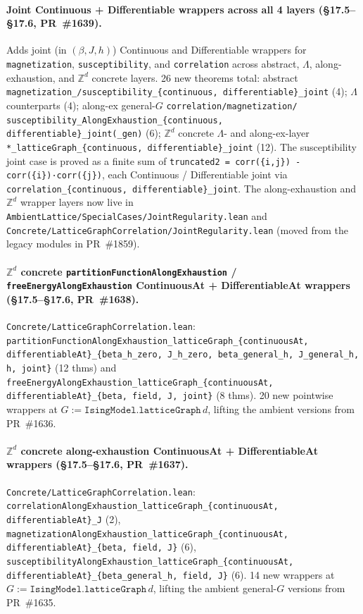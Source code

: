 \documentclass[a4paper,11pt]{article}
\begin{document}
\paragraph{Joint Continuous + Differentiable wrappers across
all 4 layers
(\S17.5--\S17.6, PR~\#1639).} Adds joint (in $(\beta, J, h)$)
Continuous and Differentiable wrappers for
\texttt{magnetization}, \texttt{susceptibility}, and
\texttt{correlation} across abstract, $\Lambda$, along-exhaustion,
and $\mathbb{Z}^d$ concrete layers. 26 new theorems total:
abstract \texttt{magnetization\_/susceptibility\_\{continuous,
differentiable\}\_joint} (4); $\Lambda$ counterparts (4); along-ex
general-$G$ \texttt{correlation/magnetization/
susceptibility\_AlongExhaustion\_\{continuous,
differentiable\}\_joint(\_gen)} (6); $\mathbb{Z}^d$ concrete
$\Lambda$- and along-ex-layer
\texttt{*\_latticeGraph\_\{continuous, differentiable\}\_joint}
(12). The susceptibility joint case is proved as a finite sum of
\texttt{truncated2 = corr(\{i,j\}) - corr(\{i\})·corr(\{j\})},
each Continuous / Differentiable joint via
\texttt{correlation\_\{continuous, differentiable\}\_joint}. The
along-exhaustion and $\mathbb{Z}^d$ wrapper layers now live in
\texttt{AmbientLattice/SpecialCases/JointRegularity.lean} and
\texttt{Concrete/LatticeGraphCorrelation/JointRegularity.lean}
(moved from the legacy modules in PR~\#1859).

\paragraph{$\mathbb{Z}^d$ concrete
\texttt{partitionFunctionAlongExhaustion} /
\texttt{freeEnergyAlongExhaustion} ContinuousAt +
DifferentiableAt wrappers
(\S17.5--\S17.6, PR~\#1638).}
\texttt{Concrete/LatticeGraphCorrelation.lean}:
\texttt{partitionFunctionAlongExhaustion\_latticeGraph\_\{continuousAt,
differentiableAt\}\_\{beta\_h\_zero, J\_h\_zero,
beta\_general\_h, J\_general\_h, h, joint\}} (12 thms) and
\texttt{freeEnergyAlongExhaustion\_latticeGraph\_\{continuousAt,
differentiableAt\}\_\{beta, field, J, joint\}} (8 thms). 20 new
pointwise wrappers at $G := \texttt{IsingModel.latticeGraph}\,d$,
lifting the ambient versions from PR~\#1636.

\paragraph{$\mathbb{Z}^d$ concrete along-exhaustion
ContinuousAt + DifferentiableAt wrappers
(\S17.5--\S17.6, PR~\#1637).}
\texttt{Concrete/LatticeGraphCorrelation.lean}:
\texttt{correlationAlongExhaustion\_latticeGraph\_\{continuousAt,
differentiableAt\}\_J} (2),
\texttt{magnetizationAlongExhaustion\_latticeGraph\_\{continuousAt,
differentiableAt\}\_\{beta, field, J\}} (6),
\texttt{susceptibilityAlongExhaustion\_latticeGraph\_\{continuousAt,
differentiableAt\}\_\{beta\_general\_h, field, J\}} (6). 14 new
wrappers at $G := \texttt{IsingModel.latticeGraph}\,d$, lifting the
ambient general-$G$ versions from PR~\#1635.
\end{document}
